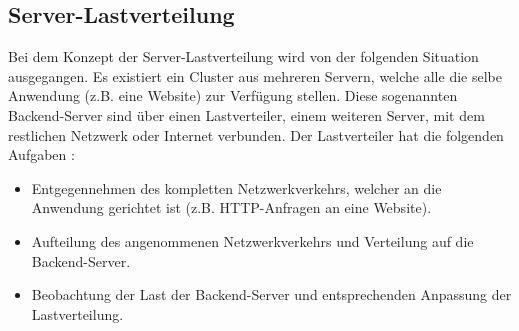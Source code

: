 \documentclass[a4paper, 12pt, BCOR10mm, DIV12, toc=bibliography, toc=listof, german]{scrbook}
\begin{document}
			\subsection*{Server-Lastverteilung} %

			Bei dem Konzept der Server-Lastverteilung wird von der folgenden Situation ausgegangen.  Es
			existiert ein Cluster aus mehreren Servern, welche alle die selbe Anwendung (z.B. eine Website)
			zur Verfügung stellen. Diese sogenannten Backend-Server sind über einen Lastverteiler, einem weiteren
			Server, mit dem restlichen Netzwerk oder Internet verbunden. Der Lastverteiler hat die
			folgenden Aufgaben \cite{bourke2001}:

			\begin{itemize}
				\item Entgegennehmen des kompletten Netzwerkverkehrs, welcher an die Anwendung gerichtet ist
					(z.B. HTTP-Anfragen an eine Website).
				\item Aufteilung des angenommenen Netzwerkverkehrs und Verteilung auf die Backend-Server.
				\item Beobachtung der Last der Backend-Server und entsprechenden Anpassung der
					Lastverteilung.
			\end{itemize}
\end{document}
